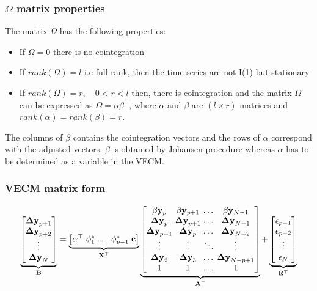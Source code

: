 \documentclass[compress,red]{beamer}
\begin{document}
\begin{frame}
\frametitle{$\Omega$ matrix properties}
The matrix $\Omega$ has the following properties:
\begin{itemize}
\item If $\Omega = 0$ there is no cointegration
\item If $rank(\Omega)=l$ i.e full rank, then the time series are not
I(1) but stationary
\item If $rank(\Omega)=r,\quad 0 < r < l$ then, there is cointegration
and the matrix $\Omega$ can be expressed as $\Omega =
\alpha \beta^\top$, where $\alpha$ and $\beta$ are $(l \times r)$
matrices and $rank(\alpha)=rank(\beta)=r$.
\end{itemize}
The columns of $\beta$ contains the cointegration vectors and the rows of
$\alpha$ correspond with the adjusted vectors. $\beta$ is obtained by Johansen
procedure whereas $\alpha$ has to be determined as a
variable in the VECM.
\end{frame}


\begin{frame}
\frametitle{VECM matrix form}
\small
\begin{equation*}
\underbrace{
      \begin{bmatrix}
       \mathbf{\Delta y}_{p+1}  \\ 
       \mathbf{\Delta y}_{p+2}  \\ 
       \vdots                   \\ 
       \mathbf{\Delta y}_N      
      \end{bmatrix}}_{\mathbf{B} } =
\arraycolsep=1.4pt  
\underbrace{\begin{bmatrix}
   \alpha^\top & \phi^*_1 & \dots & \phi^*_{p-1} &\mathbf{c}   
  \end{bmatrix}}_{\mathbf{X}^\top}
\underbrace{\begin{bmatrix}
 \beta\mathbf{y}_p      & \beta\mathbf{y}_{p+1}   & \dots&   \beta\mathbf{y}_{N-1}   \\
 \mathbf{\Delta y}_{p}   & \mathbf{\Delta y}_{p+1}& \dots &  \mathbf{\Delta y}_{N-1} \\
 \mathbf{\Delta y}_{p-1} & \mathbf{\Delta y}_{p}  & \dots &  \mathbf{\Delta y}_{N-2}   \\
 \vdots                  & \vdots                 & \ddots&  \vdots                   \\
 \mathbf{\Delta y}_{2}   & \mathbf{\Delta y}_{3} & \dots &   \mathbf{\Delta y}_{N-p+1} \\
 1                      & 1                       & \dots     & 1   
 \end{bmatrix}}_{\mathbf{A}^\top}
+
\underbrace{\begin{bmatrix}
              \mathbf{\epsilon}_{p+1} \\ 
              \mathbf{\epsilon}_{p+2} \\ 
              \vdots \\ 
              \mathbf{\epsilon}_N
             \end{bmatrix}}_{\mathbf{E}^\top}
\end{equation*}
\end{frame}
\end{document}
